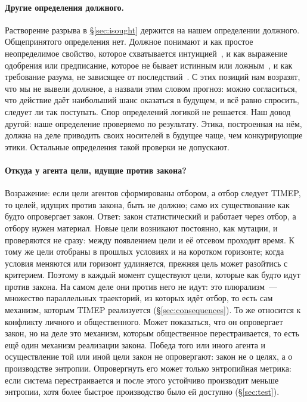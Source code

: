 \documentclass[11pt,a4paper]{article}
\newcommand{\Sref}[1]{\hyperref[#1]{\S\ref{#1}}}
\begin{document}
\paragraph{Другие определения должного.}
Растворение разрыва в \Sref{sec:isought} держится на нашем определении должного. Общепринятого определения нет. Должное понимают и как простое неопределимое свойство, которое схватывается интуицией~\cite{moore1903}, и как выражение одобрения или предписание, которое не бывает истинным или ложным~\cite{ayer1936,hare1952}, и как требование разума, не зависящее от последствий~\cite{kant1785}. С этих позиций нам возразят, что мы не вывели должное, а назвали этим словом прогноз: можно согласиться, что действие даёт наибольший шанс оказаться в будущем, и всё равно спросить, следует ли так поступать. Спор определений логикой не решается. Наш довод другой: наше определение проверяемо по результату. Этика, построенная на нём, должна на деле приводить своих носителей в будущее чаще, чем конкурирующие этики. Остальные определения такой проверки не допускают.

\paragraph{Откуда у агента цели, идущие против закона?}
Возражение: если цели агентов сформированы отбором, а отбор следует TIMEP, то целей, идущих против закона, быть не должно; само их существование как будто опровергает закон. Ответ: закон статистический и работает через отбор, а отбору нужен материал. Новые цели возникают постоянно, как мутации, и проверяются не сразу: между появлением цели и её отсевом проходит время. К тому же цели отобраны в прошлых условиях и на коротком горизонте; когда условия меняются или горизонт удлиняется, прежняя цель может разойтись с критерием. Поэтому в каждый момент существуют цели, которые как будто идут против закона. На самом деле они против него не идут: это плюрализм~--- множество параллельных траекторий, из которых идёт отбор, то есть сам механизм, которым TIMEP реализуется (\Sref{sec:consequences}). То же относится к конфликту личного и общественного. Может показаться, что он опровергает закон, но на деле это механизм, которым общественное перестраивается, то есть ещё один механизм реализации закона. Победа того или иного агента и осуществление той или иной цели закон не опровергают: закон не о целях, а о производстве энтропии. Опровергнуть его может только энтропийная метрика: если система перестраивается и после этого устойчиво производит меньше энтропии, хотя более быстрое производство было ей доступно (\Sref{sec:test}).
\end{document}
